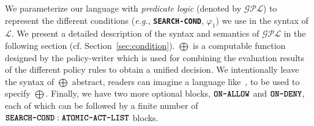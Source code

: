 \documentclass{sig-alternate}
\newcommand{\eg}{\textit{e.g.}\xspace}
\newcommand{\planguage}{\ensuremath{\mathbf{\mathcal{GPL}}}\xspace}
\newcommand{\funcname}[1]{\textbf{\texttt{#1}}}
\newcommand{\policy}{\ensuremath{\varphi}\xspace}
\newcommand{\cL}{\ensuremath{\mathcal{L}}\xspace}
\begin{document}

We parameterize our language with \emph{predicate logic} (denoted by \planguage) to represent the different 
conditions (\eg,  \funcname{SEARCH-COND}, $\policy_1$) we use in the syntax of \cL. 
We present a detailed description of the syntax and semantics of \planguage in the 
following section (cf. Section~\ref{sec:condition}).  
$\bigoplus$ is a computable function designed by the policy-writer which is used 
for combining the evaluation results of the different policy rules to obtain a unified 
decision. We intentionally leave the syntax of $\bigoplus$ abstract, readers can imagine a 
language like~\cite{NINGHUI-POLICY-COMBINATION,POLICY-ALGEBRA}, 
to be used to specify $\bigoplus$. Finally, we have two more optional blocks, $\funcname{ON-ALLOW}$ and $\funcname{ON-DENY}$, 
each of which can be followed by  a finite number of $\funcname{SEARCH-COND}: \funcname{ATOMIC-ACT-LIST}$ blocks. 
\end{document}
